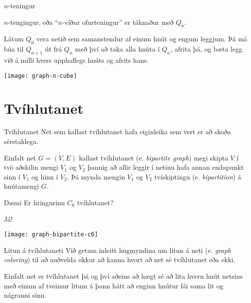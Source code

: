\documentclass{beamer}
\begin{document}
\begin{frame}{$n$-teningur}
\begin{tcolorbox}[title=$n$-teningur]
$n$-tengingur, eða ``$n$-víður ofurteningur'' er táknaður með $Q_n$.

Látum $Q_0$ vera netið sem samanstendur af einum hnút og engum leggjum. Þá má búa til $Q_{n+1}$ út frá $Q_n$ með því að taka alla hnúta í $Q_n$, afrita þá, og bæta legg við á milli hvers upphaflegs hnúts og afrits hans.
\end{tcolorbox}

\begin{center}
\texttt{[image: graph-n-cube]}
\end{center}
\end{frame}

\section{Tvíhlutanet}

\begin{frame}{Tvíhlutanet}
Net sem kallast tvíhlutanet hafa eiginleika sem vert er að skoða sérstaklega.
\begin{tcolorbox}[title=Tvíhlutanet]
Einfalt net $G = (V,E)$ kallast tvíhlutanet (e. \emph{bipartite graph}) megi skipta $V$ í tvö aðskilin mengi $V_1$ og $V_2$ þannig að allir leggir í netinu hafa annan endapunkt sinn í $V_1$ og hinn í $V_2$. Þá mynda mengin $V_1$ og $V_2$ tvískiptingu (e. \emph{bipartition}) á hnútamengi $G$.
\end{tcolorbox}

\end{frame}

\begin{frame}{Dæmi}
Er hringurinn $C_6$ tvíhlutanet? \pause

\begin{center}
Já!

\texttt{[image: graph-bipartite-c6]}
\end{center}
\end{frame}

\begin{frame}{Litun á tvíhlutaneti}
Við getum inleitt hugmyndina um litun á neti (e. \emph{graph coloring}) til að auðvelda okkur að kanna hvort að net sé tvíhlutanet eða ekki.

\begin{tcolorbox}[title=Litun tvíhlutanets]
Einfalt net er tvíhlutanet þá og því aðeins að hægt sé að lita hvern hnút netsins með einum af tveimur litum á þann hátt að enginn hnútur fái sama lit og nágranni sinn.
\end{tcolorbox}

\end{frame}
\end{document}
